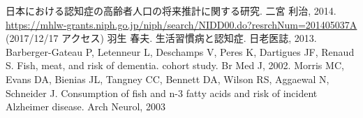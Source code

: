 \documentclass[openany,11pt,papersize]{jsbook}
\begin{document}

\begin{thebibliography}{9}
     日本における認知症の高齢者人口の将来推計に関する研究. 二宮 利治, 2014. \\ \url{https://mhlw-grants.niph.go.jp/niph/search/NIDD00.do?resrchNum=201405037A} (2017/12/17 アクセス)
     羽生 春夫. 生活習慣病と認知症. 日老医誌, 2013.
     Barberger-Gateau P, Letenneur L, Deschamps V, Peres K, Dartigues JF, Renaud S. Fish, meat, and risk of dementia. cohort study. Br Med J, 2002.
     Morris MC, Evans DA, Bienias JL, Tangney  CC, Bennett DA, Wilson RS, Aggaewal N, Schneider J. Consumption of fish and n-3 fatty acids and risk of incident Alzheimer disease. Arch Neurol, 2003
\end{thebibliography}
\end{document}
